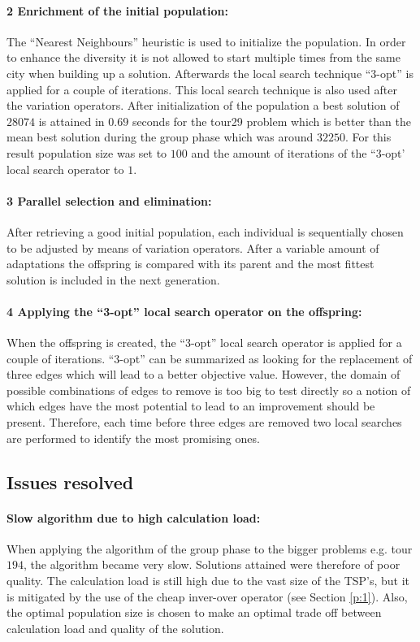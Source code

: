 \documentclass[a4paper,10pt]{article}
\begin{document}
\paragraph{2 Enrichment of the initial population:}\label{p:2} The ``Nearest Neighbours'' heuristic is used to initialize the population. In order to enhance the diversity it is not allowed to start multiple times from the same city when building up a solution. Afterwards the local search technique ``3-opt'' is applied for a couple of iterations. This local search technique is also used after the variation operators. After initialization of the population a best solution of $28074$ is attained in $0.69$ seconds for the tour29 problem which is better than the mean best solution during the group phase which was around $32250$. For this result population size was set to $100$ and the amount of iterations of the ``3-opt' local search operator to $ 1 $.

\paragraph{3 Parallel selection and elimination:}\label{p:3} After retrieving a good initial population, each individual is sequentially chosen to be adjusted by means of variation operators. After a variable amount of adaptations the offspring is compared with its parent and the most fittest solution is included in the next generation. 

\paragraph{4 Applying the ``3-opt'' local search operator on the offspring:} When the offspring is created, the ``3-opt'' local search operator is applied for a couple of iterations. ``3-opt'' can be summarized as looking for the replacement of three edges which will lead to a better objective value.
However, the domain of possible combinations of edges to remove is too big to test directly so a notion of which edges have the most potential to lead to an improvement should be present. Therefore, each time before three edges are removed two local searches are performed to identify the most promising ones.

\subsection{Issues resolved}

\paragraph{Slow algorithm due to high calculation load:} When applying the algorithm of the group phase to the bigger problems e.g. tour $194$, the algorithm became very slow. Solutions attained were therefore of poor quality. The calculation load is still high due to the vast size of the TSP's, but it is mitigated by the use of the cheap inver-over operator (see Section \ref{p:1}).  Also, the optimal population size is chosen to make an optimal trade off between  calculation load and quality of the solution.
\end{document}

